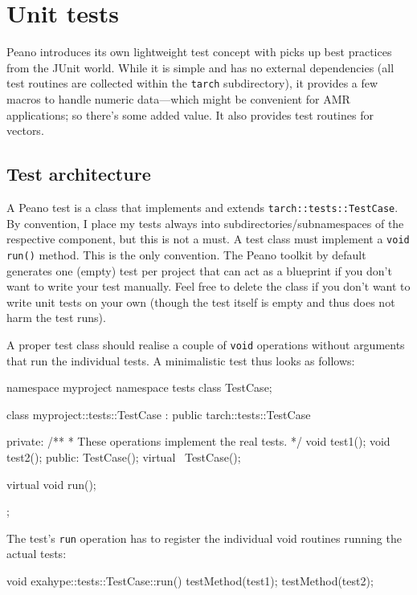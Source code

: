 \chapter{Unit tests}
\label{section:test}


Peano introduces its own lightweight test concept with picks up best practices
from the JUnit world. 
While it is simple and has no external dependencies (all test routines are
collected within the \texttt{tarch} subdirectory), it provides a few macros to
handle numeric data---which might be convenient for AMR applications; so
there's some added value. It also provides test routines for vectors.


\section{Test architecture}

A Peano test is a class that implements and extends
\texttt{tarch::tests::TestCase}.
By convention, I place my tests always into subdirectories/subnamespaces of the
respective component, but this is not a must.
A test class must implement a \texttt{void run()} method.
This is the only convention. 
The Peano toolkit by default generates one (empty) test per project that can act
as a blueprint if you don't want to write your test manually. 
Feel free to delete the class if you don't want to write unit tests on your own
(though the test itself is empty and thus does not harm the test runs).

A proper test class should realise a couple of \texttt{void} operations without
arguments that run the individual tests.
A minimalistic test thus looks as follows:

\begin{code}
namespace myproject {
  namespace tests {
    class TestCase;
  }
}

class myproject::tests::TestCase : public tarch::tests::TestCase {
 private:
  /**
   * These operations implement the real tests.
   */
  void test1();
  void test2();
 public:
  TestCase();
  virtual ~TestCase();

  virtual void run();
};
\end{code}

\noindent
The test's \texttt{run} operation has to register the individual void
  routines running the actual tests:
  \begin{code}
void exahype::tests::TestCase::run() {
  testMethod(test1);
  testMethod(test2);
}
  \end{code}




